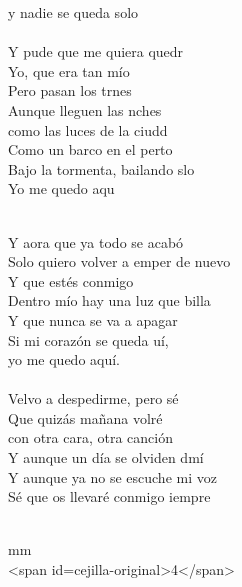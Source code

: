 \begin{cancion}
y nadie se queda solo\\
\jump\\
	Y pude que me quiera quedr\\
Yo, que era tan mío\\
	Pero pasan los trnes\\
	Aunque lleguen las nches \\
	como las luces de la ciudd\\
	Como un barco en el perto\\
	Bajo la tormenta, bailando slo\\
	Yo me quedo aqu \\\jump\\
	\begin{chorus}%
	Y aora que ya todo se acabó\\
	Solo quiero volver a emper de nuevo\\
Y que estés conmigo\\
	Dentro mío hay una luz que billa\\
Y que nunca se va a apagar\\
	Si mi corazón se queda uí, \\
yo me quedo aquí.\\
\jump\\
	Velvo a despedirme, pero sé\\
	Que quizás mañana volré \\
con otra cara, otra canción\\
	Y aunque un día se olviden dmí\\
Y aunque ya no se escuche mi voz\\
	Sé que os llevaré conmigo iempre\\
	\end{chorus}%
	\jump\\
	mm \\
<span id=cejilla-original>4</span>\\
\end{cancion}%
